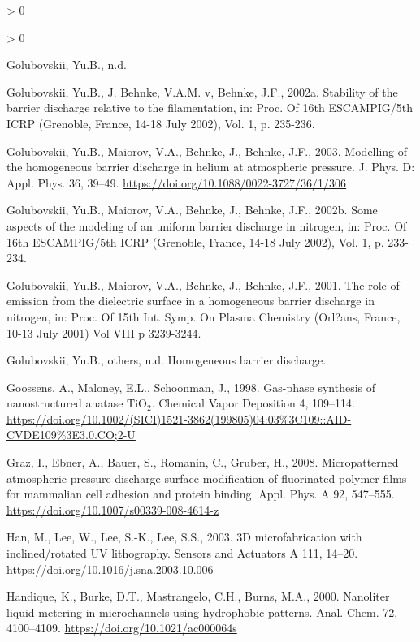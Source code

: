 \documentclass[
  11pt,
  twoside]{article}
\newlength{\cslhangindent}
\newenvironment{CSLReferences}[2] %
 {%
  \setlength{\parindent}{0pt}
  \ifodd #1 \everypar{\setlength{\hangindent}{\cslhangindent}}\ignorespaces\fi
  \ifnum #2 > 0
  \setlength{\parskip}{#2\baselineskip}
  \fi
 }%
 {}
\begin{document}
\begin{CSLReferences}{1}{0}
\begin{CSLReferences}{1}{0}
\leavevmode\hypertarget{ref-Filament}{}%
Golubovskii, Yu.B., n.d.

\leavevmode\hypertarget{ref-Golub02-2}{}%
Golubovskii, Yu.B., J. Behnke, V.A.M. v, Behnke, J.F., 2002a. Stability of the barrier discharge relative to the filamentation, in: Proc. Of 16th ESCAMPIG/5th ICRP (Grenoble, France, 14-18 July 2002), Vol. 1, p. 235-236.

\leavevmode\hypertarget{ref-Golub03}{}%
Golubovskii, Yu.B., Maiorov, V.A., Behnke, J., Behnke, J.F., 2003. Modelling of the homogeneous barrier discharge in helium at atmospheric pressure. J. Phys. D: Appl. Phys. 36, 39--49. \url{https://doi.org/10.1088/0022-3727/36/1/306}

\leavevmode\hypertarget{ref-Golub02}{}%
Golubovskii, Yu.B., Maiorov, V.A., Behnke, J., Behnke, J.F., 2002b. Some aspects of the modeling of an uniform barrier discharge in nitrogen, in: Proc. Of 16th ESCAMPIG/5th ICRP (Grenoble, France, 14-18 July 2002), Vol. 1, p. 233-234.

\leavevmode\hypertarget{ref-Golub01}{}%
Golubovskii, Yu.B., Maiorov, V.A., Behnke, J., Behnke, J.F., 2001. The role of emission from the dielectric surface in a homogeneous barrier discharge in nitrogen, in: Proc. Of 15th Int. Symp. On Plasma Chemistry (Orl?ans, France, 10-13 July 2001) Vol VIII p 3239-3244.

\leavevmode\hypertarget{ref-GolubWeb}{}%
Golubovskii, Yu.B., others, n.d. Homogeneous barrier discharge.

\leavevmode\hypertarget{ref-Goos1998}{}%
Goossens, A., Maloney, E.L., Schoonman, J., 1998. Gas-phase synthesis of nanostructured anatase \(\mathrm{TiO_2}\). Chemical Vapor Deposition 4, 109--114. \url{https://doi.org/10.1002/(SICI)1521-3862(199805)04:03\%3C109::AID-CVDE109\%3E3.0.CO;2-U}

\leavevmode\hypertarget{ref-Graz08}{}%
Graz, I., Ebner, A., Bauer, S., Romanin, C., Gruber, H., 2008. Micropatterned atmospheric pressure discharge surface modification of fluorinated polymer films for mammalian cell adhesion and protein binding. Appl. Phys. A 92, 547--555. \url{https://doi.org/10.1007/s00339-008-4614-z}

\leavevmode\hypertarget{ref-Han04}{}%
Han, M., Lee, W., Lee, S.-K., Lee, S.S., 2003. {3D microfabrication with inclined/rotated UV lithography}. Sensors and Actuators A 111, 14--20. \url{https://doi.org/10.1016/j.sna.2003.10.006}

\leavevmode\hypertarget{ref-Hand00}{}%
Handique, K., Burke, D.T., Mastrangelo, C.H., Burns, M.A., 2000. {Nanoliter liquid metering in microchannels using hydrophobic patterns}. Anal. Chem. 72, 4100--4109. \url{https://doi.org/10.1021/ac000064s}


\end{CSLReferences}
\end{CSLReferences}
\end{document}
